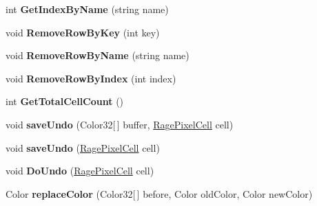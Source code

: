 \begin{DoxyCompactItemize}
\item 
\hypertarget{class_rage_pixel_sprite_sheet_a11300c3042982073e0a597262f821ca5}{int {\bfseries Get\-Index\-By\-Name} (string name)}\label{class_rage_pixel_sprite_sheet_a11300c3042982073e0a597262f821ca5}

\item 
\hypertarget{class_rage_pixel_sprite_sheet_a14e0f896028db7cd3ba5f9b91296d9e2}{void {\bfseries Remove\-Row\-By\-Key} (int key)}\label{class_rage_pixel_sprite_sheet_a14e0f896028db7cd3ba5f9b91296d9e2}

\item 
\hypertarget{class_rage_pixel_sprite_sheet_a6c9d468880df0f7a32bee1b68706472a}{void {\bfseries Remove\-Row\-By\-Name} (string name)}\label{class_rage_pixel_sprite_sheet_a6c9d468880df0f7a32bee1b68706472a}

\item 
\hypertarget{class_rage_pixel_sprite_sheet_a8c731ec816c2851f8fbd3ca4a8e7be9f}{void {\bfseries Remove\-Row\-By\-Index} (int index)}\label{class_rage_pixel_sprite_sheet_a8c731ec816c2851f8fbd3ca4a8e7be9f}

\item 
\hypertarget{class_rage_pixel_sprite_sheet_afb25696fccd110b409bb90c2cfbeb4a0}{int {\bfseries Get\-Total\-Cell\-Count} ()}\label{class_rage_pixel_sprite_sheet_afb25696fccd110b409bb90c2cfbeb4a0}

\item 
\hypertarget{class_rage_pixel_sprite_sheet_a93454e8ef7e23d61acf7a988040de8bc}{void {\bfseries save\-Undo} (Color32\mbox{[}$\,$\mbox{]} buffer, \hyperlink{class_rage_pixel_cell}{Rage\-Pixel\-Cell} cell)}\label{class_rage_pixel_sprite_sheet_a93454e8ef7e23d61acf7a988040de8bc}

\item 
\hypertarget{class_rage_pixel_sprite_sheet_adf108aa4645abf42b61b0e04705b9ff1}{void {\bfseries save\-Undo} (\hyperlink{class_rage_pixel_cell}{Rage\-Pixel\-Cell} cell)}\label{class_rage_pixel_sprite_sheet_adf108aa4645abf42b61b0e04705b9ff1}

\item 
\hypertarget{class_rage_pixel_sprite_sheet_ae762040f2d1a0974f01479874c16dcf4}{void {\bfseries Do\-Undo} (\hyperlink{class_rage_pixel_cell}{Rage\-Pixel\-Cell} cell)}\label{class_rage_pixel_sprite_sheet_ae762040f2d1a0974f01479874c16dcf4}

\item 
\hypertarget{class_rage_pixel_sprite_sheet_a92c49828ae825af2ed039a5169308159}{Color {\bfseries replace\-Color} (Color32\mbox{[}$\,$\mbox{]} before, Color old\-Color, Color new\-Color)}\label{class_rage_pixel_sprite_sheet_a92c49828ae825af2ed039a5169308159}


\end{DoxyCompactItemize}
